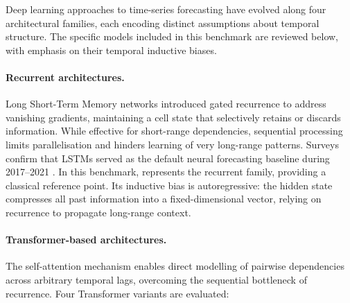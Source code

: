 Deep learning approaches to time-series forecasting have evolved along four architectural families, each encoding distinct assumptions about temporal structure.  The specific models included in this benchmark are reviewed below, with emphasis on their temporal inductive biases.

\paragraph{Recurrent architectures.}
Long Short-Term Memory networks \citep{Hochreiter1997, Gers2000} introduced gated recurrence to address vanishing gradients, maintaining a cell state that selectively retains or discards information.  While effective for short-range dependencies, sequential processing limits parallelisation and hinders learning of very long-range patterns.  Surveys confirm that LSTMs served as the default neural forecasting baseline during 2017--2021 \citep{Hewamalage2021, Lim2021}.  In this benchmark, \lstm represents the recurrent family, providing a classical reference point.  Its inductive bias is autoregressive: the hidden state compresses all past information into a fixed-dimensional vector, relying on recurrence to propagate long-range context.

\paragraph{Transformer-based architectures.}
The self-attention mechanism \citep{Vaswani2017} enables direct modelling of pairwise dependencies across arbitrary temporal lags, overcoming the sequential bottleneck of recurrence.  Four Transformer variants are evaluated:

